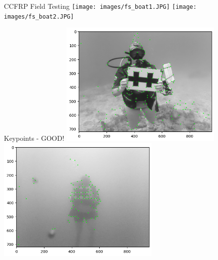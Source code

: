 
\begin{frame}{CCFRP Field Testing}
    \centering
    \texttt{[image: images/fs\_boat1.JPG]}
    \texttt{[image: images/fs\_boat2.JPG]}
\end{frame}

\begin{frame}{Keypoints - GOOD!}
    \centering
    \includegraphics[height=0.6\textheight,width=0.6\textwidth,keepaspectratio]{images/fs_success1.png}
    \includegraphics[height=0.6\textheight,width=0.6\textwidth,keepaspectratio]{images/fs_success2.png}
\end{frame}


